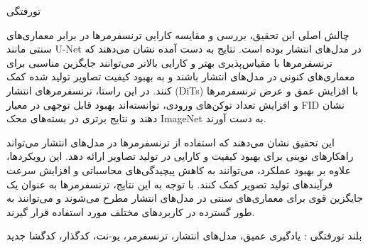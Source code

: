 

‌تورفتگی

چالش اصلی این تحقیق، بررسی و مقایسه کارایی ترنسفرمرها در برابر معماری‌های سنتی مانند U-Net در مدل‌های انتشار بوده است. نتایج به دست آمده نشان می‌دهند که ترنسفرمرها با مقیاس‌پذیری بهتر و کارایی بالاتر می‌توانند جایگزین مناسبی برای معماری‌های کنونی در مدل‌های انتشار باشند و به بهبود کیفیت تصاویر تولید شده کمک کنند. در این راستا، ترنسفرمرهای انتشار (DiTs) با افزایش عمق و عرض ترنسفرمرها و افزایش تعداد توکن‌های ورودی، توانسته‌اند بهبود قابل توجهی در معیار FID نشان دهند و نتایج برتری در بسته‌های محک ImageNet به دست آورند.

این تحقیق نشان می‌دهند که استفاده از ترنسفرمرها در مدل‌های انتشار می‌تواند راهکارهای نوینی برای بهبود کیفیت و کارایی در تولید تصاویر ارائه دهد. این رویکردها، علاوه بر بهبود عملکرد، می‌توانند به کاهش پیچیدگی‌های محاسباتی و افزایش سرعت فرآیندهای تولید تصویر کمک کنند. با توجه به این نتایج، ترنسفرمرها به عنوان یک جایگزین قوی برای معماری‌های سنتی در مدل‌های انتشار مطرح می‌شوند و می‌توانند به طور گسترده در کاربردهای مختلف مورد استفاده قرار گیرند.




‌بلند
‌تورفتگی : 
یادگیری عمیق، مدل‌های انتشار، ترنسفرمر، یو-نت، کدگذار، کدگشا
‌جدید
